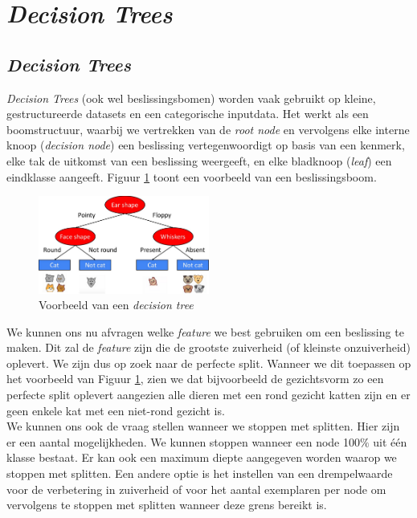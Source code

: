 \section{\textit{Decision Trees}}

\subsection{\textit{Decision Trees}}

\textit{Decision Trees} (ook wel beslissingsbomen) worden vaak gebruikt op kleine, gestructureerde datasets en een categorische inputdata. Het werkt als een boomstructuur, waarbij we vertrekken van de \textit{root node} en vervolgens elke interne knoop (\textit{decision node}) een beslissing vertegenwoordigt op basis van een kenmerk, elke tak de uitkomst van een beslissing weergeeft, en elke bladknoop (\textit{leaf}) een eindklasse aangeeft.  Figuur \ref{fig:decision-tree} toont een voorbeeld van een beslissingsboom.

\begin{figure}[h]
	\centering
	\includegraphics[width=0.5\textwidth]{images/29-decision-tree.png}
	\caption{Voorbeeld van een \textit{decision tree}}
	\label{fig:decision-tree}
\end{figure}
\noindent
We kunnen ons nu afvragen welke \textit{feature} we best gebruiken om een beslissing te maken. Dit zal de \textit{feature} zijn die de grootste zuiverheid (of kleinste onzuiverheid) oplevert. We zijn dus op zoek naar de perfecte split. Wanneer we dit toepassen op het voorbeeld van Figuur \ref{fig:decision-tree}, zien we dat bijvoorbeeld de gezichtsvorm zo een perfecte split oplevert aangezien alle dieren met een rond gezicht katten zijn en er geen enkele kat met een niet-rond gezicht is. \\
\newline
We kunnen ons ook de vraag stellen wanneer we stoppen met splitten. Hier zijn er een aantal mogelijkheden. We kunnen stoppen wanneer een node 100$\%$ uit één klasse bestaat. Er kan ook een maximum diepte aangegeven worden waarop we stoppen met splitten. Een andere optie is het instellen van een drempelwaarde voor de verbetering in zuiverheid of voor het aantal exemplaren per node om vervolgens te stoppen met splitten wanneer deze grens bereikt is.

